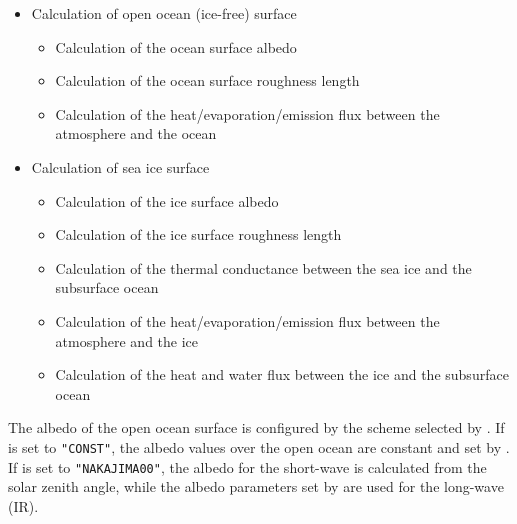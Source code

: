 \begin{itemize}
   \item Calculation of open ocean (ice-free) surface
   \begin{itemize}
      \item Calculation of the ocean surface albedo
      \item Calculation of the ocean surface roughness length
      \item Calculation of the heat/evaporation/emission flux between the atmosphere and the ocean
   \end{itemize}

   \item Calculation of sea ice surface
   \begin{itemize}
      \item Calculation of the ice surface albedo
      \item Calculation of the ice surface roughness length
      \item Calculation of the thermal conductance between the sea ice and the subsurface ocean
      \item Calculation of the heat/evaporation/emission flux between the atmosphere and the ice
      \item Calculation of the heat and water flux between the ice and the subsurface ocean
   \end{itemize}
\end{itemize}



The albedo of the open ocean surface is configured by the scheme selected by .
If  is set to \verb|"CONST"|, the albedo values over the open ocean are constant and set by .
If  is set to \verb|"NAKAJIMA00"|, the albedo for the short-wave is calculated from the solar zenith angle,
while the albedo parameters set by  are used for the long-wave (IR).



